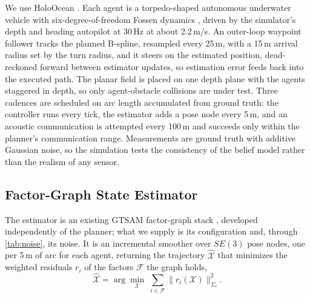 \documentclass[letterpaper, 10 pt, conference]{ieeeconf}
\theoremstyle{remark}
\begin{document}
We use HoloOcean \cite{potokar2022holoocean}. Each agent is a torpedo-shaped
autonomous underwater vehicle with six-degree-of-freedom Fossen dynamics
\cite{fossen2021handbook}, driven by the simulator's depth and heading
autopilot at 30\,Hz at about 2.2\,m/s. An outer-loop waypoint follower
tracks the planned B-spline, resampled every 25\,m, with a 15\,m arrival
radius set by the turn radius, and it steers on the estimated position,
dead-reckoned forward between estimator updates, so estimation error feeds
back into the executed path. The planar field is placed on one depth plane
with the agents staggered in depth, so only agent-obstacle collisions are
under test. Three cadences are scheduled on arc length accumulated from
ground truth: the controller runs every tick, the estimator adds a pose node every 5\,m, and
an acoustic communication is attempted every 100\,m and succeeds only within
the planner's communication range. Measurements are ground truth with
additive Gaussian noise, so the simulation tests the consistency of the
belief model rather than the realism of any sensor.

\subsection{Factor-Graph State Estimator}

The estimator is an existing GTSAM factor-graph stack
\cite{kaess2012isam2,dellaert2017factor}, developed independently of the
planner; what we supply is its configuration and, through
\cref{tab:noise}, its noise. It is an incremental smoother
\cite{kaess2012isam2} over $SE(3)$ pose nodes, one per 5\,m of arc for each
agent, returning the trajectory $\hat{\mathcal X}$ that minimizes the weighted
residuals $r_i$ of the factors $\mathcal F$ the graph holds,
\begin{equation}
  \hat{\mathcal X}=\arg\min_{\mathcal X}\;\sum_{i\in\mathcal F}
    \big\lVert r_i(\mathcal X)\big\rVert^{2}_{\Sigma_i}.
  \label{eq:fg}
\end{equation}
\end{document}
